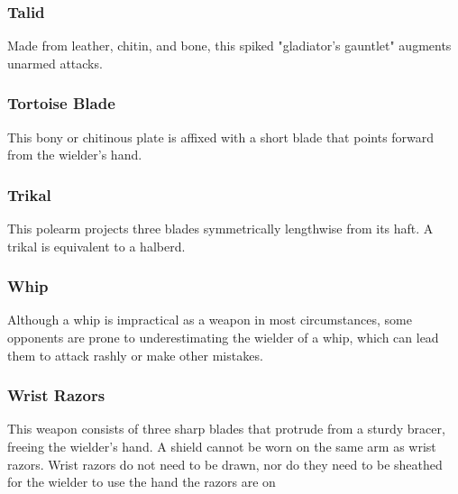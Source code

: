 \begin{multicols}{2}
\subsubsection{Talid}
\label{itmmlee:talid}
Made from leather, chitin, and bone, this spiked
"gladiator's gauntlet" augments unarmed attacks.

\subsubsection{Tortoise Blade}
\label{itmmlee:tortoiseblade}
This bony or chitinous plate is affixed with a short
blade that points forward from the wielder's hand.

\subsubsection{Trikal}
\label{itmmlee:trikal}
This polearm projects three blades symmetrically lengthwise
from its haft. A trikal is equivalent to a halberd.

\subsubsection{Whip}
\label{itmmlee:whip}
Although a whip is impractical as a weapon
in most circumstances, some opponents are prone
to underestimating the wielder of a whip, which can
lead them to attack rashly or make other mistakes.

\subsubsection{Wrist Razors}
\label{itmmlee:wristrazors}
This weapon consists of three sharp blades that protrude from
a sturdy bracer, freeing the wielder's hand. A shield cannot
be worn on the same arm as wrist razors. Wrist razors do not
need to be drawn, nor do they need to be sheathed for the
wielder to use the hand the razors are on

\end{multicols}
